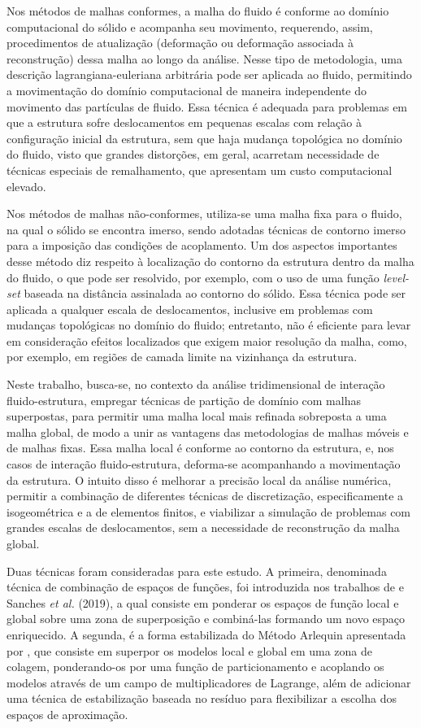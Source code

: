 Nos métodos de malhas conformes, a malha do fluido é conforme ao domínio computacional do sólido e acompanha seu movimento, requerendo, assim, procedimentos de atualização (deformação ou deformação associada à reconstrução) dessa malha ao longo da análise. Nesse tipo de metodologia, uma descrição lagrangiana-euleriana arbitrária pode ser aplicada ao fluido, permitindo a movimentação do domínio computacional de maneira independente do movimento das partículas de fluido. Essa técnica é adequada para problemas em que a estrutura sofre deslocamentos em pequenas escalas com relação à configuração inicial da estrutura, sem que haja mudança topológica no domínio do fluido, visto que grandes distorções, em geral, acarretam necessidade de técnicas especiais de remalhamento, que apresentam um custo computacional elevado.

Nos métodos de malhas não-conformes, utiliza-se uma malha fixa para o fluido, na qual o sólido se encontra imerso, sendo adotadas técnicas de contorno imerso para a imposição das condições de acoplamento. Um dos aspectos importantes desse método diz respeito à localização do contorno da estrutura dentro da malha do fluido, o que pode ser resolvido, por exemplo, com o uso de uma função \textit{level-set} baseada na distância assinalada ao contorno do sólido. Essa técnica pode ser aplicada a qualquer escala de deslocamentos, inclusive em problemas com mudanças topológicas no domínio do fluido; entretanto, não é eficiente para levar em consideração efeitos localizados que exigem maior resolução da malha, como, por exemplo, em regiões de camada limite na vizinhança da estrutura.

Neste trabalho, busca-se, no contexto da análise tridimensional de interação fluido-estrutura, empregar técnicas de partição de domínio com malhas superpostas, para permitir uma malha local mais refinada sobreposta a uma malha global, de modo a unir as vantagens das metodologias de malhas móveis e de malhas fixas. Essa malha local é conforme ao contorno da estrutura, e, nos casos de interação fluido-estrutura, deforma-se acompanhando a movimentação da estrutura. O intuito disso é melhorar a precisão local da análise numérica, permitir a combinação de diferentes técnicas de discretização, especificamente a isogeométrica e a de elementos finitos, e viabilizar a simulação de problemas com grandes escalas de deslocamentos, sem a necessidade de reconstrução da malha global.

Duas técnicas foram consideradas para este estudo. A primeira, denominada técnica de combinação de espaços de funções, foi introduzida nos trabalhos de  e Sanches \textit{et al.} (2019), a qual consiste em ponderar os espaços de função local e global sobre uma zona de superposição e combiná-las formando um novo espaço enriquecido. A segunda, é a forma estabilizada do Método Arlequin apresentada por , que consiste em superpor os modelos local e global em uma zona de colagem, ponderando-os por uma função de particionamento e acoplando os modelos através de um campo de multiplicadores de Lagrange, além de adicionar uma técnica de estabilização baseada no resíduo para flexibilizar a escolha dos espaços de aproximação.

